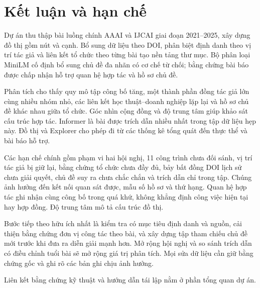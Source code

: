 \chapter{Kết luận và hạn chế}
Dự án thu thập \Papers{} bài luồng chính AAAI và IJCAI giai đoạn 2021--2025,
xây dựng đồ thị gồm \TotalNodes{} nút và \TotalEdges{} cạnh. Bổ sung
dữ liệu theo DOI, phân biệt định danh theo vị trí tác giả và liên kết tổ chức
theo từng bài tạo nền tảng thư mục. Bộ phân loại MiniLM cố định bổ sung chủ
đề đa nhãn có cơ chế từ chối; bằng chứng bài báo được chấp nhận hỗ trợ quan
hệ hợp tác và hồ sơ chủ đề.

Phân tích cho thấy quy mô tập công bố tăng, một thành phần đồng tác giả lớn
cùng nhiều nhóm nhỏ, các liên kết học thuật--doanh nghiệp lặp lại và hồ sơ chủ
đề khác nhau giữa tổ chức. Góc nhìn cộng đồng và độ trung tâm giúp khảo sát
cấu trúc hợp tác. Informer là bài được trích dẫn nhiều nhất trong tập dữ liệu
hẹp này. Đồ thị và Explorer cho phép đi từ các thống kê tổng quát đến thực thể
và bài báo hỗ trợ.

Các hạn chế chính gồm phạm vi hai hội nghị, 11 công trình chưa đối sánh, vị
trí tác giả bị giữ lại, bằng chứng tổ chức chưa đầy đủ, bảy bất đồng DOI lịch
sử chưa giải quyết, chủ đề suy ra chưa chắc chắn và trích dẫn chỉ trong tập.
Chúng ảnh hưởng đến kết nối quan sát được, mẫu số hồ sơ và thứ hạng. Quan hệ
hợp tác ghi nhận cùng công bố trong quá khứ, không khẳng định công việc hiện
tại hay hợp đồng. Độ trung tâm mô tả cấu trúc đồ thị.

Bước tiếp theo hữu ích nhất là kiểm tra có mục tiêu định danh và nguồn, cải
thiện bằng chứng đơn vị công tác theo bài, và xây dựng tập tham chiếu chủ đề
mới trước khi đưa ra diễn giải mạnh hơn. Mở rộng hội nghị và so sánh trích dẫn
có điều chỉnh tuổi bài sẽ mở rộng giá trị phân tích. Mọi sửa dữ liệu cần giữ
bằng chứng gốc và ghi rõ các bản ghi chịu ảnh hưởng.

Liên kết bằng chứng kỹ thuật và hướng dẫn tái lập nằm ở phần tổng quan dự án.
